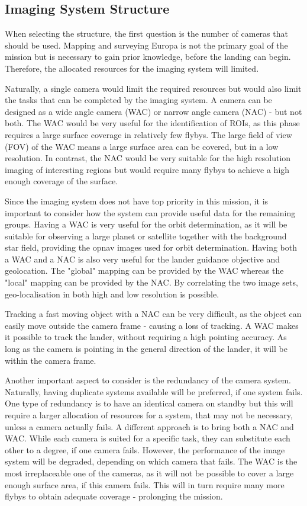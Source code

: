 \subsection{Imaging System Structure}
When selecting the structure, the first question is the number of cameras that should be used. Mapping and surveying Europa is not the primary goal of the mission but is necessary to gain prior knowledge, before the landing can begin. Therefore, the allocated resources for the imaging system will limited.

Naturally, a single camera would limit the required resources but would also limit the tasks that can be completed by the imaging system. A camera can be designed as a wide angle camera (WAC) or narrow angle camera (NAC) - but not both. The WAC would be very useful for the identification of ROIs, as this phase requires a large surface coverage in relatively few flybys. The large field of view (FOV) of the WAC means a large surface area can be covered, but in a low resolution. In contrast, the NAC would be very suitable for the high resolution imaging of interesting regions but would require many flybys to achieve a high enough coverage of the surface.

Since the imaging system does not have top priority in this mission, it is important to consider how the system can provide useful data for the remaining groups. Having a WAC is very useful for the orbit determination, as it will be suitable for observing a large planet or satellite together with the background star field, providing the opnav images used for orbit determination. Having both a WAC and a NAC is also very useful for the lander guidance objective and geolocation. The "global" mapping can be provided by the WAC whereas the "local" mapping can be provided by the NAC. By correlating the two image sets, geo-localisation in both high and low resolution is possible.

Tracking a fast moving object with a NAC can be very difficult, as the object can easily move outside the camera frame - causing a loss of tracking. A WAC makes it possible to track the lander, without requiring a high pointing accuracy. As long as the camera is pointing in the general direction of the lander, it will be within the camera frame.

Another important aspect to consider is the redundancy of the camera system. Naturally, having duplicate systems available will be preferred, if one system fails. One type of redundancy is to have an identical camera on standby but this will require a larger allocation of resources for a system, that may not be necessary, unless a camera actually fails. A different approach is to bring both a NAC and WAC. While each camera is suited for a specific task, they can substitute each other to a degree, if one camera fails. However, the performance of the image system will be degraded, depending on which camera that fails. The WAC is the most irreplaceable one of the cameras, as it will not be possible to cover a large enough surface area, if this camera fails. This will in turn require many more flybys to obtain adequate coverage - prolonging the mission.

